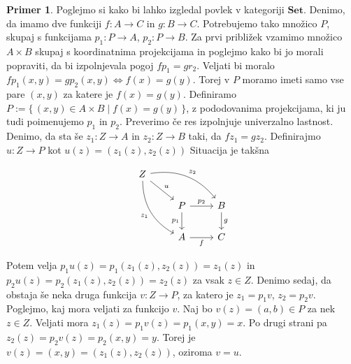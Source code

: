 \documentclass[12pt,a4paper]{book}
\theoremstyle{definition}
\theoremstyle{plain}
\theoremstyle{definition}
\newtheorem{primer}{Primer}[section]
\theoremstyle{remark}
\newcommand{\cat}[1]{\textbf{#1}}
\renewcommand{\set}[1]{\{\,#1\,\}}
\begin{document}
\begin{primer}
Poglejmo si kako bi lahko izgledal povlek v kategoriji $\cat{Set}$. Denimo, da imamo dve funkciji $f : A \to C$ in $g : B \to C$. Potrebujemo tako množico $P$, skupaj s funkcijama $p_1 : P \to A$, $p_2 : P \to B$. Za prvi približek vzamimo množico $A \times B$ skupaj s koordinatnima projekcijama in poglejmo kako bi jo morali popraviti, da bi izpolnjevala pogoj $fp_1 = gr_2$. Veljati bi moralo $fp_1(x,y) = gp_2(x,y) \Leftrightarrow f(x) = g(y)$. Torej v $P$ moramo imeti samo vse pare $(x,y)$ za katere je $f(x) = g(y)$. Definiramo $P := \set{(x,y) \in A \times B \mid f(x) = g(y)}$, z pododovanima projekcijama, ki ju tudi poimenujemo $p_1$ in $p_2$. Preverimo če res izpolnjuje univerzalno lastnost. Denimo, da sta še $z_1 : Z \to A$ in $z_2 : Z \to B$ taki, da $fz_1 = gz_2$. Definirajmo $u : Z \to P$ kot $u(z) = (z_1(z), z_2(z))$
Situacija je takšna

$$\begin{tikzcd}
Z
\arrow[drr, bend left, "z_2"]
\ar[dr, "u"]
\arrow[ddr, bend right, "z_1"'] & & \\
& P \arrow[r, "p_2"] \arrow[d, "p_1"']
& B \arrow[d, "g"] \\
& A \arrow[r, "f"']
& C
\end{tikzcd}$$

Potem velja $p_1u(z) = p_1(z_1(z),z_2(z)) = z_1(z)$ in $p_2u(z) = p_2(z_1(z),z_2(z)) = z_2(z)$ za vsak $z \in Z$. Denimo sedaj, da obstaja še neka druga funkcija $v : Z \to P$, za katero je $z_1 = p_1v$, $z_2 = p_2v$. Poglejmo, kaj mora veljati za funkcijo $v$. Naj bo $v(z) = (a,b) \in P$ za nek $z \in Z$. Veljati mora $z_1(z) = p_1v(z) = p_1(x,y) = x$. Po drugi strani pa $z_2(z) = p_2v(z) = p_2(x,y) = y$. Torej je $v(z) = (x,y) = (z_1(z),z_2(z))$, oziroma $v = u$.
\end{primer}
\end{document}
